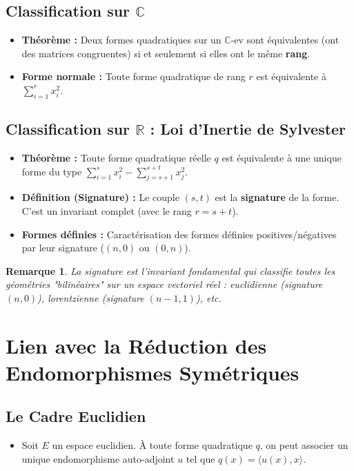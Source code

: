 \documentclass[12pt, a4paper, parskip=full]{report}
\theoremstyle{agregstyle}
\newtheorem{remark}[definition]{Remarque}
\begin{document}
\subsection{Classification sur $\mathbb{C}$}
\begin{itemize}
    \item \textbf{Théorème :} Deux formes quadratiques sur un $\mathbb{C}$-ev sont équivalentes (ont des matrices congruentes) si et seulement si elles ont le même \textbf{rang}.
    \item \textbf{Forme normale :} Toute forme quadratique de rang $r$ est équivalente à $\sum_{i=1}^r x_i^2$.
\end{itemize}

\subsection{Classification sur $\mathbb{R}$ : Loi d'Inertie de Sylvester}
\begin{itemize}
    \item \textbf{Théorème :} Toute forme quadratique réelle $q$ est équivalente à une unique forme du type $\sum_{i=1}^s x_i^2 - \sum_{j=s+1}^{s+t} x_j^2$.
    \item \textbf{Définition (Signature) :} Le couple $(s,t)$ est la \textbf{signature} de la forme. C'est un invariant complet (avec le rang $r=s+t$).
    \item \textbf{Formes définies :} Caractérisation des formes définies positives/négatives par leur signature ($(n,0)$ ou $(0,n)$).
\end{itemize}
\begin{remark}
    La signature est l'invariant fondamental qui classifie toutes les géométries "bilinéaires" sur un espace vectoriel réel : euclidienne (signature $(n,0)$), lorentzienne (signature $(n-1,1)$), etc.
\end{remark}

\section{Lien avec la Réduction des Endomorphismes Symétriques}

\subsection{Le Cadre Euclidien}
\begin{itemize}
    \item Soit $E$ un espace euclidien. À toute forme quadratique $q$, on peut associer un unique endomorphisme auto-adjoint $u$ tel que $q(x) = \langle u(x), x \rangle$.
\end{itemize}
\end{document}
